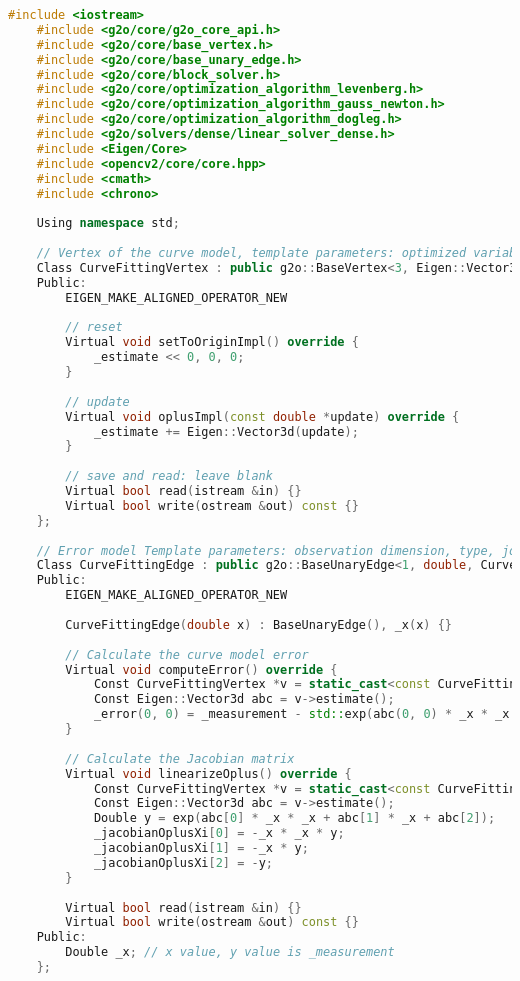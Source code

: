 \begin{lstlisting}[language=c++,caption=slambook/ch6/g2oCurveFitting.cpp]
    #include <iostream>
    #include <g2o/core/g2o_core_api.h>
    #include <g2o/core/base_vertex.h>
    #include <g2o/core/base_unary_edge.h>
    #include <g2o/core/block_solver.h>
    #include <g2o/core/optimization_algorithm_levenberg.h>
    #include <g2o/core/optimization_algorithm_gauss_newton.h>
    #include <g2o/core/optimization_algorithm_dogleg.h>
    #include <g2o/solvers/dense/linear_solver_dense.h>
    #include <Eigen/Core>
    #include <opencv2/core/core.hpp>
    #include <cmath>
    #include <chrono>
    
    Using namespace std;
    
    // Vertex of the curve model, template parameters: optimized variable dimensions and data types
    Class CurveFittingVertex : public g2o::BaseVertex<3, Eigen::Vector3d> {
    Public:
        EIGEN_MAKE_ALIGNED_OPERATOR_NEW
        
        // reset
        Virtual void setToOriginImpl() override {
            _estimate << 0, 0, 0;
        }
        
        // update
        Virtual void oplusImpl(const double *update) override {
            _estimate += Eigen::Vector3d(update);
        }
        
        // save and read: leave blank
        Virtual bool read(istream &in) {}
        Virtual bool write(ostream &out) const {}
    };
    
    // Error model Template parameters: observation dimension, type, join vertex type
    Class CurveFittingEdge : public g2o::BaseUnaryEdge<1, double, CurveFittingVertex> {
    Public:
        EIGEN_MAKE_ALIGNED_OPERATOR_NEW
        
        CurveFittingEdge(double x) : BaseUnaryEdge(), _x(x) {}
        
        // Calculate the curve model error
        Virtual void computeError() override {
            Const CurveFittingVertex *v = static_cast<const CurveFittingVertex *> (_vertices[0]);
            Const Eigen::Vector3d abc = v->estimate();
            _error(0, 0) = _measurement - std::exp(abc(0, 0) * _x * _x + abc(1, 0) * _x + abc(2, 0));
        }
        
        // Calculate the Jacobian matrix
        Virtual void linearizeOplus() override {
            Const CurveFittingVertex *v = static_cast<const CurveFittingVertex *> (_vertices[0]);
            Const Eigen::Vector3d abc = v->estimate();
            Double y = exp(abc[0] * _x * _x + abc[1] * _x + abc[2]);
            _jacobianOplusXi[0] = -_x * _x * y;
            _jacobianOplusXi[1] = -_x * y;
            _jacobianOplusXi[2] = -y;
        }
        
        Virtual bool read(istream &in) {}
        Virtual bool write(ostream &out) const {}
    Public:
        Double _x; // x value, y value is _measurement
    };
    

\end{lstlisting}
